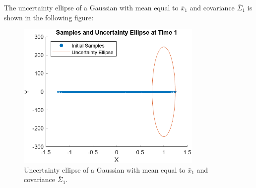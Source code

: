 \documentclass[answers]{exam}
\begin{document}
\begin{questions}
\begin{parts}
\begin{solution}
            The uncertainty ellipse of a Gaussian with mean equal to \(\bar{x}_1\) and
            covariance \(\bar{\Sigma}_1\) is shown in the following figure:
            \begin{figure}[H]
                \centering
                \includegraphics[width=0.8\textwidth]{images/2c.png}
                \caption{Uncertainty ellipse of a Gaussian with mean equal to \(\bar{x}_1\) and covariance \(\bar{\Sigma}_1\).}
            \end{figure}
        \end{solution}


\end{parts}
\end{questions}
\end{document}
